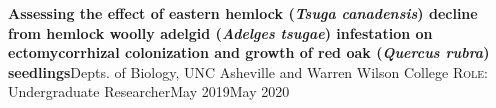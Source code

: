 {\entrybigwrap
    {{\textbf{Assessing the effect of eastern hemlock (\textit{Tsuga canadensis}) {decline from hemlock woolly adelgid} (\textit{Adelges tsugae}) {infestation on ectomycorrhizal colonization and growth of red oak} (\textit{Quercus rubra}) {seedlings}}}{\hfill Depts. of Biology, UNC Asheville and Warren Wilson College}}
    {{\textsc{Role:} Undergraduate Researcher}{\hfill May 2019\textendash May 2020}}
}
